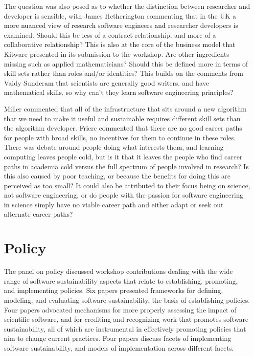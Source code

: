 \documentclass[11pt, oneside]{amsart}
\newcommand{\note}[1]{ {\textcolor{red}    { #1 }}}
\begin{document}
The question was also posed as to whether the distinction between researcher
and developer is sensible, with James Hetherington commenting that in the UK
a more nuanced view of research software engineers
and researcher developers is examined. Should this be less of a contract relationship, and
more of a collaborative relationship? This is also at the core of the business
model that Kitware presented in its submission to the workshop. Are other
ingredients missing such as applied mathematicians? Should this be defined more
in terms of skill sets rather than roles and/or identities? This builds on the
comments from Vaidy Sunderam that scientists are generally good writers, and
have mathematical skills, so why can't they learn software engineering
principles?

Miller commented that all of the infrastructure that sits around a new
algorithm that we need to make it useful and sustainable requires different
skill sets than the algorithm developer. Friere commented that there are no
good career paths for people with broad skills, no incentives for them to
continue in these roles. There was debate around people doing what interests
them, and learning computing leaves people cold, but is it that it leaves the
people who find career paths in academia cold versus the full spectrum of
people involved in research? Is this also caused by poor teaching, or because the
benefits for doing this are perceived as too small? It could also be attributed to
their focus being on science, not software engineering, or do people with
the passion for software engineering in science simply have no viable career
path and either adapt or seek out alternate career paths?

\section{Policy} \label{sec:policy}%

The  panel on policy  discussed workshop
contributions dealing with the wide range of software sustainability
aspects that relate to establishing, promoting, and implementing
policies. Six papers presented frameworks for defining, modeling, and
evaluating software sustainability, the basis of establishing
policies. Four papers advocated mechanisms for more properly assessing
the impact of scientific software, and for crediting and recognizing
work that promotes software sustainability, all of which are
instrumental in effectively promoting policies that aim to change
current practices. Four papers discuss facets of implementing software
sustainability, and models of implementation across different facets.
\end{document}
